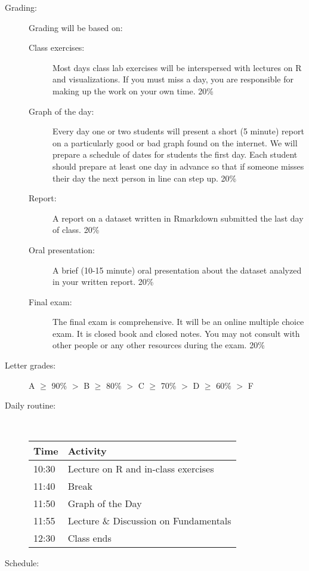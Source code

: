 \documentclass[12pt]{article}
\newcommand{\myitem}[1]{\item[#1]}
\begin{document}
\begin{description}
\myitem{Grading:}  Grading will be based on:
\begin{description}

\item[Class exercises:]   Most days class lab exercises will be 
interspersed with lectures on R and visualizations.  If you must miss a day,
you are responsible for making up the work on your own time.  20\%

\item[Graph of the day:] Every day one or two students will present
a short (5 minute) report on a particularly good or bad graph found on
the internet.   We will prepare a schedule of dates for students the
first day.  Each student should prepare at least one day in advance
so that if someone misses their day the next person in line can step up.
 20\% 

\item[Report:]  A report on a dataset 
written in Rmarkdown submitted the last day of class.  20\%

\item[Oral presentation:] A brief (10-15 minute) oral presentation
about the dataset analyzed in your written report.  20\%

\item[Final exam:]  The final exam is comprehensive. It will be an
online multiple choice exam.  It is closed book and closed notes.
You may not consult with other people or any other resources
during the exam.  20\%

\end{description}
\item[Letter grades:]
A $\ge$ 90\% $>$ B $\ge$ 80\% $>$ C $\ge$ 70\% $>$ D $\ge$ 60\% $>$ F

\item[Daily routine:]~

\begin{tabular}{ll}
Time & Activity \\\hline
10:30  & Lecture  on R and in-class exercises \\
11:40  & Break \\
11:50  & Graph of the Day \\
11:55  & Lecture \& Discussion on Fundamentals\\
12:30 & Class ends
\end{tabular}

\myitem{Schedule:}~


\end{description}
\end{document}
